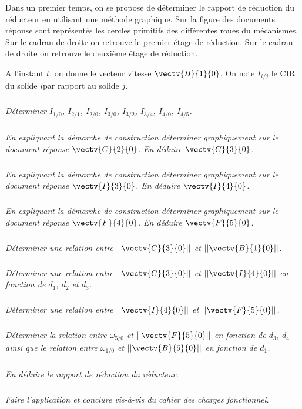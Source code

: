 \documentclass[10pt]{article}
\begin{document}
Dans un premier temps, on se propose de déterminer le rapport de réduction du réducteur en utilisant une méthode graphique. Sur la figure des documents réponse sont représentés les cercles primitifs des différentes roues du mécanismes. Sur le cadran de droite on retrouve le premier étage de réduction. Sur le cadran de droite on retrouve le deuxième étage de réduction.

A l'instant $t$, on donne le vecteur vitesse $\vectv{B}{1}{0}$. On note $I_{i/j}$ le CIR du solide $i$par rapport au solide $j$.

\subparagraph{}
\textit{Déterminer $I_{1/0}$, $I_{2/1}$, $I_{2/0}$, $I_{3/0}$, $I_{3/2}$, $I_{3/4}$, $I_{4/0}$, $I_{4/5}$.}


\subparagraph{}
\textit{En expliquant la démarche de construction déterminer graphiquement sur le document réponse $\vectv{C}{2}{0}$. En déduire $\vectv{C}{3}{0}$.}

\subparagraph{}
\textit{En expliquant la démarche de construction déterminer graphiquement sur le document réponse $\vectv{I}{3}{0}$. En déduire $\vectv{I}{4}{0}$.}

\subparagraph{}
\textit{En expliquant la démarche de construction déterminer graphiquement sur le document réponse $\vectv{F}{4}{0}$. En déduire $\vectv{F}{5}{0}$.}

\subparagraph{}
\textit{Déterminer une relation entre $||\vectv{C}{3}{0}||$ et $||\vectv{B}{1}{0}||$.}

\subparagraph{}
\textit{Déterminer une relation entre $||\vectv{C}{3}{0}||$ et $||\vectv{I}{4}{0}||$ en fonction de $d_1$, $d_2$ et $d_3$.}

\subparagraph{}
\textit{Déterminer une relation entre $||\vectv{I}{4}{0}||$ et $||\vectv{F}{5}{0}||$.}

\subparagraph{}
\textit{Déterminer la relation entre $\omega_{5/0}$ et $||\vectv{F}{5}{0}||$ en fonction de $d_3$, $d_4$ ainsi que le relation entre $\omega_{1/0}$ et $||\vectv{B}{5}{0}||$ en fonction de $d_1$.}

\subparagraph{}
\textit{En déduire le rapport de réduction du réducteur.}

\subparagraph{}
\textit{Faire l'application et conclure vis-à-vis du cahier des charges fonctionnel.}


\begin{center}
\end{center}
\end{document}
